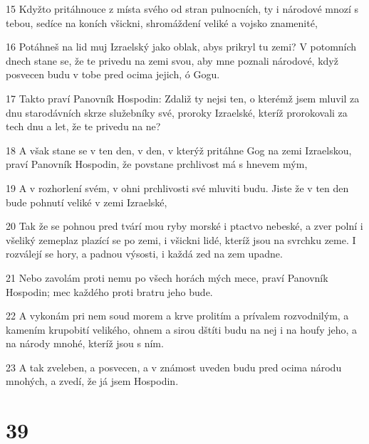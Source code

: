 \par 15 Kdyžto pritáhnouce z místa svého od stran pulnocních, ty i národové mnozí s tebou, sedíce na koních všickni, shromáždení veliké a vojsko znamenité,
\par 16 Potáhneš na lid muj Izraelský jako oblak, abys prikryl tu zemi? V potomních dnech stane se, že te privedu na zemi svou, aby mne poznali národové, když posvecen budu v tobe pred ocima jejich, ó Gogu.
\par 17 Takto praví Panovník Hospodin: Zdaliž ty nejsi ten, o kterémž jsem mluvil za dnu starodávních skrze služebníky své, proroky Izraelské, kteríž prorokovali za tech dnu a let, že te privedu na ne?
\par 18 A však stane se v ten den, v den, v kterýž pritáhne Gog na zemi Izraelskou, praví Panovník Hospodin, že povstane prchlivost má s hnevem mým,
\par 19 A v rozhorlení svém, v ohni prchlivosti své mluviti budu. Jiste že v ten den bude pohnutí veliké v zemi Izraelské,
\par 20 Tak že se pohnou pred tvárí mou ryby morské i ptactvo nebeské, a zver polní i všeliký zemeplaz plazící se po zemi, i všickni lidé, kteríž jsou na svrchku zeme. I rozválejí se hory, a padnou výsosti, i každá zed na zem upadne.
\par 21 Nebo zavolám proti nemu po všech horách mých mece, praví Panovník Hospodin; mec každého proti bratru jeho bude.
\par 22 A vykonám pri nem soud morem a krve prolitím a prívalem rozvodnilým, a kamením krupobití velikého, ohnem a sirou dštíti budu na nej i na houfy jeho, a na národy mnohé, kteríž jsou s ním.
\par 23 A tak zveleben, a posvecen, a v známost uveden budu pred ocima národu mnohých, a zvedí, že já jsem Hospodin.

\chapter{39}

